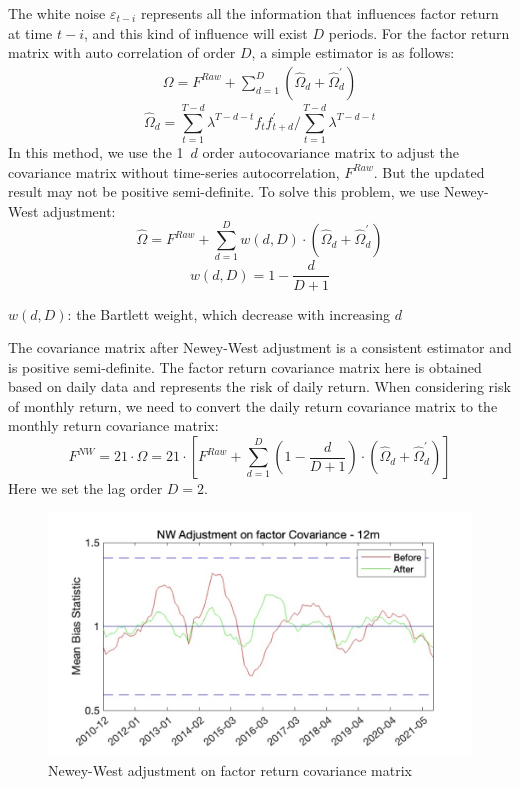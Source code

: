 \documentclass[10pt]{article}
\begin{document}
The white noise $\varepsilon _{t-i}$ represents all the information that influences factor return at time $t-i$, and this kind of influence will exist $D$ periods. For the factor return matrix with auto correlation of order $D$, a simple estimator is as follows:
\begin{align}
\varOmega =F^{Raw}+\sum_{d=1}^D{\left( \hat{\varOmega}_d+\hat{\varOmega}_{d}^{\prime} \right)}
\end{align}
$$
\hat{\varOmega}_d=\sum_{t=1}^{T-d}{\lambda ^{T-d-t}f_tf_{t+d}^{\prime}}/\sum_{t=1}^{T-d}{\lambda ^{T-d-t}}
$$
In this method, we use the 1~$d$ order autocovariance matrix to adjust the covariance matrix without time-series autocorrelation, $F^{Raw}$. But the updated result may not be positive semi-definite. To solve this problem, we use Newey-West adjustment:
\begin{equation*}
\hat{\Omega} = F^{Raw}+\sum_{d=1}^{D}w(d,D)\cdot(\hat{\Omega}_d+\hat{\Omega}^{'}_d) 
\end{equation*}
\begin{equation*}
w(d,D) = 1-\frac{d}{D+1}
\end{equation*}
\begin{center}
$w(d,D)$: the Bartlett weight, which decrease with increasing $d$
\end{center}
The covariance matrix after Newey-West adjustment is a consistent estimator and is positive semi-definite.
The factor return covariance matrix here is obtained based on daily data and represents the risk of daily return. When considering risk of monthly return, we need to convert the daily return covariance matrix to the monthly return covariance matrix:
\begin{equation*}
F^{NW} = 21\cdot\hat{\Omega}=21\cdot[F^{Raw}+\sum_{d=1}^{D}(1-\frac{d}{D+1})\cdot(\hat{\Omega}_d+\hat{\Omega}^{'}_d)]
\end{equation*}
Here we set the lag order $D=2$.

\begin{figure}[H]
    \centering
    \includegraphics{NW on factor.png}
    \caption{Newey-West adjustment on factor return covariance matrix}
    \label{fig:NW on factor}
\end{figure}
\end{document}
